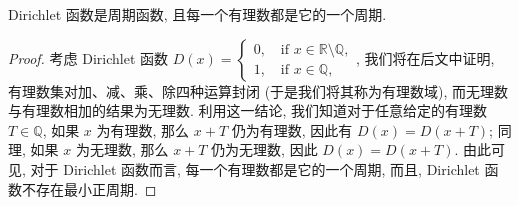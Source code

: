 \documentclass[10pt,UTF8]{book} %
\begin{document}
\begin{example}
    Dirichlet 函数是周期函数, 且每一个有理数都是它的一个周期.
    \begin{proof}
        考虑 Dirichlet 函数 $D(x) = \begin{cases}
            0, \quad \mathrm{if} \,\, x \in \mathbb{R} \setminus \mathbb{Q}, \\ 
            1, \quad \mathrm{if} \,\, x \in \mathbb{Q},
        \end{cases}$, 我们将在后文中证明, {\kaishu 有理数集对加、减、乘、除四种运算封闭} 
        (于是我们将其称为有理数域), 而{\kaishu 无理数与有理数相加的结果为无理数}.
        利用这一结论, 我们知道对于任意给定的有理数 $T \in \mathbb{Q}$,
        如果 $x$ 为有理数, 那么 $x+T$ 仍为有理数, 因此有 $D(x) = D(x+T)$;
        同理, 如果 $x$ 为无理数, 那么 $x+T$ 仍为无理数, 因此 $D(x) = D(x+T)$.
        由此可见, 对于 Dirichlet 函数而言, 每一个有理数都是它的一个周期, 而且,
        Dirichlet 函数不存在最小正周期.
    \end{proof}
\end{example}







\end{document}
